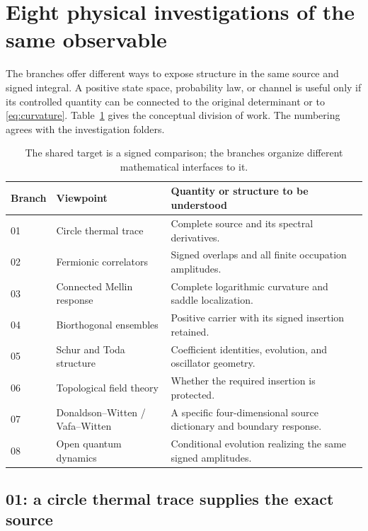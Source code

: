 \documentclass[11pt,letterpaper]{article}
\numberwithin{equation}{section}
\theoremstyle{remark}
\begin{document}
\section{Eight physical investigations of the same observable}
\label{sec:physical}

The branches offer different ways to expose structure in the same
source and signed integral. A positive state space, probability law,
or channel is useful only if its controlled quantity can be connected
to the original determinant or to \eqref{eq:curvature}.
Table~\ref{tab:branches} gives the conceptual division of work. The
numbering agrees with the investigation folders.

\begin{table}[htbp]
\centering\small
\renewcommand{\arraystretch}{1.18}
\begin{tabularx}{\textwidth}{@{}p{}>{\raggedright\arraybackslash}p{}X@{}}
\toprule
Branch & Viewpoint & Quantity or structure to be understood\\
\midrule
01 & Circle thermal trace & Complete source and its spectral derivatives.\\
02 & Fermionic correlators & Signed overlaps and all finite occupation amplitudes.\\
03 & Connected Mellin response & Complete logarithmic curvature and saddle localization.\\
04 & Biorthogonal ensembles & Positive carrier with its signed insertion retained.\\
05 & Schur and Toda structure & Coefficient identities, evolution, and oscillator geometry.\\
06 & Topological field theory & Whether the required insertion is protected.\\
07 & Donaldson--Witten / Vafa--Witten & A specific four-dimensional source dictionary and boundary response.\\
08 & Open quantum dynamics & Conditional evolution realizing the same signed amplitudes.\\
\bottomrule
\end{tabularx}
\caption{The shared target is a signed comparison; the branches organize different mathematical interfaces to it.}
\label{tab:branches}
\end{table}

\subsection{01: a circle thermal trace supplies the exact source}
\end{document}
